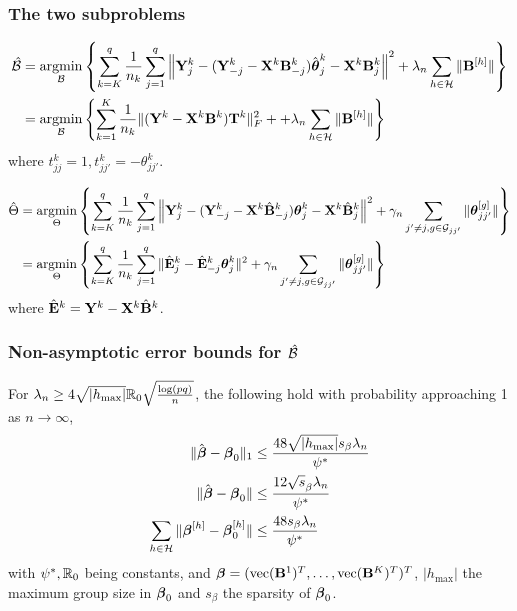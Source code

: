 \documentclass[10pt]{beamer}
\theoremstyle{definition}
\DeclareMathOperator*{\argmin}{argmin}
\DeclareMathOperator*{\ve}{vec}
\begin{document}
\begin{frame}
\frametitle{The two subproblems}
\begin{align*}
\hat \cB &=
\argmin_{\cB} \left\{
\sum_{k=K}^q \frac{1}{n_k} \sum_{j=1}^q
\left\| \bfY_j^k - ( \bfY_{-j}^k - \bfX^k \bfB_{-j}^k) \hat \bftheta_j^k
- \bfX^k \bfB_j^k \right\|^2
+ \lambda_n \sum_{h \in \cH} \| \bfB^{[h]} \| \right\}\\
&= \argmin_{\cB} \left\{ \sum_{k=1}^K \frac{1}{n_k}
\| (\bfY^k - \bfX^k \bfB^k) \bfT^k \|_F^2 +
+ \lambda_n \sum_{h \in \cH} \| \bfB^{[h]} \| \right\}
\end{align*}
%
where $t_{jj}^k = 1, t_{jj'}^k = - \theta_{jj'}^k$.

\begin{align*}
\hat \Theta &=
\argmin_{\Theta} \left\{ \sum_{k=K}^q \frac{1}{n_k} \sum_{j=1}^q
\left\| \bfY_j^k - ( \bfY_{-j}^k - \bfX^k \hat \bfB_{-j}^k) \bftheta_j^k
- \bfX^k \hat \bfB_j^k \right\|^2 
+ \gamma_n \sum_{j' \neq j, g \in \cG_{jj'}} \| \bftheta_{jj'}^{[g]} \| \right\}\\
&= \argmin_{\Theta} \left\{ 
\sum_{k=K}^q \frac{1}{n_k} \sum_{j=1}^q
\| \hat \bfE_j^k - \hat \bfE_{-j}^k \bftheta_j^k \|^2
+ \gamma_n \sum_{j' \neq j, g \in \cG_{jj'}} \| \bftheta_{jj'}^{[g]} \| \right\}
\end{align*}
%
where $\hat {{\mathbf{E}}}^k = {\mathbf{Y}}^k - {\mathbf{X}}^k \hat {{\mathbf{B}}}^k$.

\end{frame}


\begin{frame}
\frametitle{Non-asymptotic error bounds for $\hat {{\cal{B}}}$}

For $\lambda_n \geq 4 \sqrt{| h_{\max} |} {\mathbb{R}}_0 \sqrt{ \frac{ \log(pq)}{n}}$, the following hold with probability approaching 1 as $n \rightarrow \infty$,
%
\begin{align*}
\| \hat {{\boldsymbol{\beta}}} - {\boldsymbol{\beta}}_0 \|_1 & \leq \frac{48 \sqrt{ | h_{\max} |} s_\beta \lambda_n}{ \psi^*} \\
\| \hat {{\boldsymbol{\beta}}} - {\boldsymbol{\beta}}_0 \| & \leq \frac{12 \sqrt s_\beta \lambda_n}{ \psi^*} \\
\sum_{h \in {\cal{H}}} \| {\boldsymbol{\beta}}^{[h]} - {\boldsymbol{\beta}}_0^{[h]} \| & \leq \frac{48 s_\beta \lambda_n}{ \psi^*}
\end{align*}
%
with $\psi^*, {\mathbb{R}}_0$ being constants, and $\bfbeta = (\ve(\bfB^1)^T, \ldots, \ve(\bfB^K)^T)^T$, $| h_{\max} |$ the maximum group size in ${\boldsymbol{\beta}}_0$ and $s_\beta$ the sparsity of ${\boldsymbol{\beta}}_0$.
\end{frame}
\end{document}
